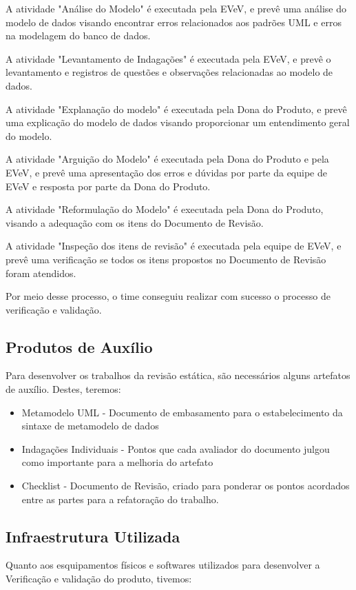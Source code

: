 A atividade "Análise do Modelo" é executada pela EVeV, e prevê uma análise do modelo de dados visando encontrar erros 
relacionados aos padrões UML e erros na modelagem do banco de dados. 

A atividade "Levantamento de Indagações" é executada pela EVeV, e prevê o levantamento e registros de questões e 
observações relacionadas ao modelo de dados. 

A atividade "Explanação do modelo" é executada pela Dona do Produto, e prevê uma explicação do modelo de dados visando 
proporcionar um entendimento geral do modelo.

A atividade "Arguição do Modelo" é executada pela Dona do Produto e pela EVeV, e prevê uma apresentação dos erros e 
dúvidas por parte da equipe de EVeV e resposta por parte da Dona do Produto.

A atividade "Reformulação do Modelo" é executada pela Dona do Produto, visando a adequação com os itens do Documento de 
Revisão.

A atividade "Inspeção dos itens de revisão" é executada pela equipe de EVeV, e prevê uma verificação se todos os itens 
propostos no Documento de Revisão foram atendidos.

Por meio desse processo, o time conseguiu realizar com sucesso o processo de verificação e validação.	


\subsection{Produtos de Auxílio}
Para desenvolver os trabalhos da revisão estática, são necessários alguns artefatos
de auxílio. Destes, teremos:

\begin{itemize}
\item Metamodelo UML - Documento de embasamento para o estabelecimento da sintaxe
de metamodelo de dados
\item Indagações Individuais - Pontos que cada avaliador do documento julgou como
importante para a melhoria do artefato
\item Checklist - Documento de Revisão, criado para ponderar os pontos acordados
entre as partes para a refatoração do trabalho.
\end{itemize}

\subsection{Infraestrutura Utilizada}
Quanto aos esquipamentos físicos e softwares utilizados para desenvolver a Verificação
e validação do produto, tivemos:

